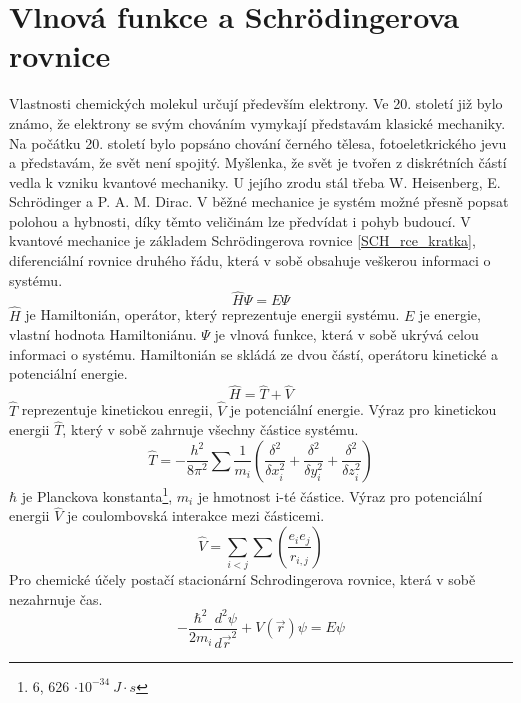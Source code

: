 \documentclass[
  digital, %
  table,   %
  lof,     %
  lot,     %
]{fithesis3}
\begin{document}
\section{Vlnová funkce a Schrödingerova rovnice}
Vlastnosti chemických molekul určují především elektrony. Ve 20. století již bylo známo, že elektrony se svým chováním vymykají představám klasické mechaniky. Na počátku 20. století bylo popsáno chování černého tělesa, fotoeletkrického jevu a představám, že svět není spojitý. Myšlenka, že svět je tvořen z diskrétních částí vedla k vzniku kvantové mechaniky. U jejího zrodu stál třeba W. Heisenberg, E. Schrödinger a P. A. M. Dirac. V běžné mechanice je systém možné přesně popsat polohou a hybnosti, díky těmto veličinám lze předvídat i pohyb budoucí. V kvantové mechanice je základem Schrödingerova rovnice \ref{SCH_rce_kratka}, diferenciální rovnice druhého řádu, která v sobě obsahuje veškerou informaci o systému.\cite{polak2000obecna}
\begin{equation}
\widehat{H} \Psi = E \Psi
\label{SCH_rce_kratka}
\end{equation}
$\widehat{H}$ je Hamiltonián, operátor, který reprezentuje energii systému. $E$ je energie, vlastní hodnota Hamiltoniánu. $\Psi$ je vlnová funkce, která v sobě ukrývá celou informaci o systému. Hamiltonián se skládá ze dvou částí, operátoru kinetické a potenciální energie.
\begin{equation}
\widehat{H} = \widehat{T} + \widehat{V}
\end{equation}
$\widehat{T}$ reprezentuje kinetickou enregii, $\widehat{V}$ je potenciální energie.
Výraz pro kinetickou energii $\widehat{T}$, který v sobě zahrnuje všechny částice systému. 
\begin{equation}
\widehat{T} = - \frac{h^2}{8 \pi ^2} \sum \frac{1}{m_i} \left( \frac{\delta^2}{\delta x_i^2} +\frac{\delta^2}{\delta y_i^2} +\frac{\delta^2}{\delta z_i^2} \right)
\end{equation}
$\hbar$  je Planckova konstanta\footnote{6, 626  $\cdot 10^{-34} ~ J \cdot s$}, $m_i$ je hmotnost i-té částice. Výraz pro potenciální energii $\widehat{V}$ je coulombovská interakce mezi částicemi.
\begin{equation}
\widehat{V} = \sum_{i<j}\sum \left( \frac{e_i e_j}{r_{i,j}}\right)
\end{equation}
 Pro chemické účely postačí stacionární Schrodingerova rovnice, která v sobě nezahrnuje čas.
\begin{equation}
-\frac{\hbar^2}{2m_i} \frac{d^2 \psi}{d\vec{r} ^2} + V(\vec{r}) \psi = E \psi
\label{schrodingerova_rovnice}
\end{equation}
\end{document}
